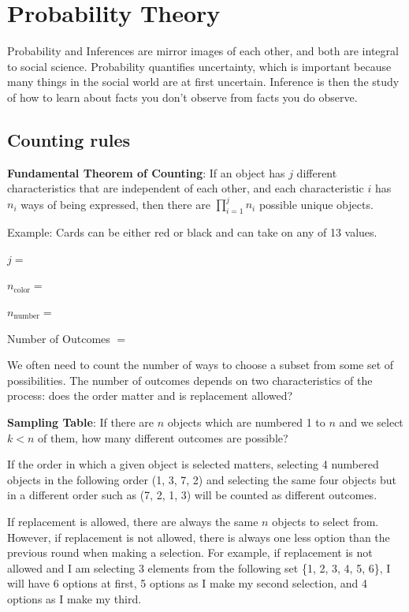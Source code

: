 \documentclass[]{book}
\theoremstyle{definition}
\theoremstyle{definition}
\theoremstyle{definition}
\theoremstyle{remark}
\begin{document}
\chapter{Probability Theory}\label{probability-theory}

Probability and Inferences are mirror images of each other, and both are
integral to social science. Probability quantifies uncertainty, which is
important because many things in the social world are at first
uncertain. Inference is then the study of how to learn about facts you
don't observe from facts you do observe.

\section{Counting rules}\label{counting-rules}

\textbf{Fundamental Theorem of Counting}: If an object has \(j\)
different characteristics that are independent of each other, and each
characteristic \(i\) has \(n_i\) ways of being expressed, then there are
\(\prod_{i = 1}^j n_i\) possible unique objects.

Example: Cards can be either red or black and can take on any of 13
values.

\(j =\)

\(n_{\text{color}} =\)

\(n_{\text{number}} =\)

Number of Outcomes \(=\)

We often need to count the number of ways to choose a subset from some
set of possibilities. The number of outcomes depends on two
characteristics of the process: does the order matter and is replacement
allowed?

\textbf{Sampling Table}: If there are \(n\) objects which are numbered 1
to \(n\) and we select \(k < n\) of them, how many different outcomes
are possible?

If the order in which a given object is selected matters, selecting 4
numbered objects in the following order (1, 3, 7, 2) and selecting the
same four objects but in a different order such as (7, 2, 1, 3) will be
counted as different outcomes.

If replacement is allowed, there are always the same \(n\) objects to
select from. However, if replacement is not allowed, there is always one
less option than the previous round when making a selection. For
example, if replacement is not allowed and I am selecting 3 elements
from the following set \{1, 2, 3, 4, 5, 6\}, I will have 6 options at
first, 5 options as I make my second selection, and 4 options as I make
my third.
\end{document}
